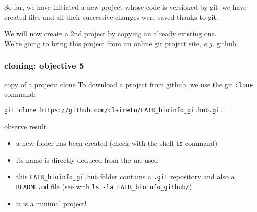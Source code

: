 \begin{frame}{}
\begin{exampleblock}{}%
     So far, we have initiated a new project whose code is versioned by git: we have created files and all their successive changes were saved thanks to git.
\end{exampleblock}
\begin{exampleblock}{}%
    We will now create a 2nd project by copying an already existing one.\\ We're going to bring this project from an online git project site, \textit{e.g.} github.
\end{exampleblock}
\end{frame}
\begin{frame}[containsverbatim]
\frametitle{ cloning: objective 5}
\begin{exampleblock}{copy of a project: clone}
To download a project from github, we use the git \verb|clone| command:
\begin{lstlisting}
git clone https://github.com/clairetn/FAIR_bioinfo_github.git
\end{lstlisting}
\end{exampleblock}
\begin{exampleblock}{observe result}
\begin{itemize}
    \item a new folder has been created (check with the shell \verb|ls| command)
    \item its name is directly deduced from the url used
    \item this \verb|FAIR_bioinfo_github| folder contains a \verb|.git| repository and also a \verb|README.md| file (see with \verb|ls -la FAIR_bioinfo_github/|)
    \item it is a minimal project!
\end{itemize}
\end{exampleblock}
\end{frame}
